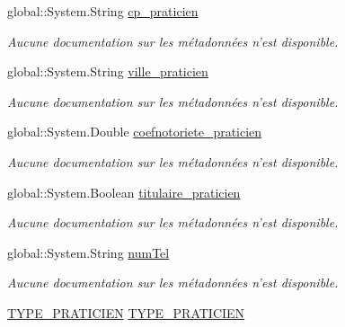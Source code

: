 \begin{DoxyCompactItemize}
global\-::\-System.\-String \hyperlink{class_model_1_1_p_r_a_t_i_c_i_e_n_a2a75459147811d5a57c500054d647925}{cp\-\_\-praticien}
\begin{DoxyCompactList}\small\item\em Aucune documentation sur les métadonnées n'est disponible. \end{DoxyCompactList}\item 
global\-::\-System.\-String \hyperlink{class_model_1_1_p_r_a_t_i_c_i_e_n_ae32f7c05fd2519a7a0b308ba1117856a}{ville\-\_\-praticien}
\begin{DoxyCompactList}\small\item\em Aucune documentation sur les métadonnées n'est disponible. \end{DoxyCompactList}\item 
global\-::\-System.\-Double \hyperlink{class_model_1_1_p_r_a_t_i_c_i_e_n_af7a6f895c280db516f12fdf90e207bae}{coefnotoriete\-\_\-praticien}
\begin{DoxyCompactList}\small\item\em Aucune documentation sur les métadonnées n'est disponible. \end{DoxyCompactList}\item 
global\-::\-System.\-Boolean \hyperlink{class_model_1_1_p_r_a_t_i_c_i_e_n_aab525a0862d5b0b441b850563c7f2a69}{titulaire\-\_\-praticien}
\begin{DoxyCompactList}\small\item\em Aucune documentation sur les métadonnées n'est disponible. \end{DoxyCompactList}\item 
global\-::\-System.\-String \hyperlink{class_model_1_1_p_r_a_t_i_c_i_e_n_a3182fceec324d9beb52831dd2f36af6f}{num\-Tel}
\begin{DoxyCompactList}\small\item\em Aucune documentation sur les métadonnées n'est disponible. \end{DoxyCompactList}\item 
\hyperlink{class_model_1_1_t_y_p_e___p_r_a_t_i_c_i_e_n}{T\-Y\-P\-E\-\_\-\-P\-R\-A\-T\-I\-C\-I\-E\-N} \hyperlink{class_model_1_1_p_r_a_t_i_c_i_e_n_ab44028a89527b640b54ed235f767ecb0}{T\-Y\-P\-E\-\_\-\-P\-R\-A\-T\-I\-C\-I\-E\-N}

\end{DoxyCompactItemize}
